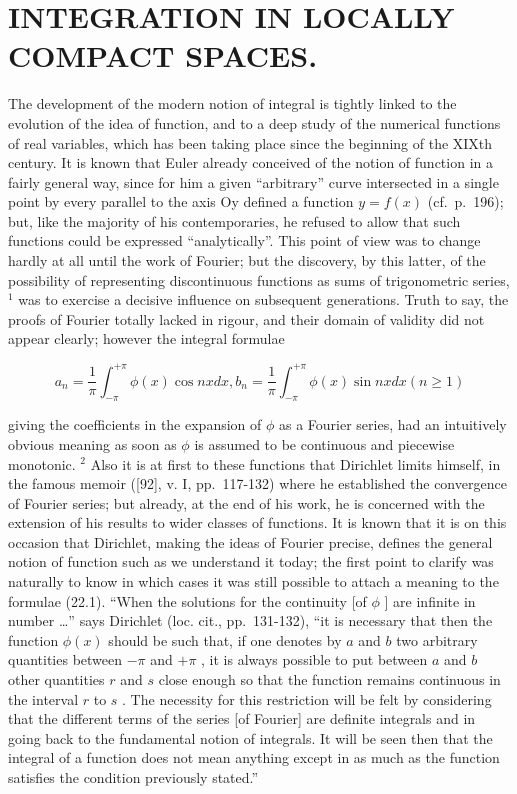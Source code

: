 \chapter{INTEGRATION IN LOCALLY COMPACT SPACES.}

The development of the modern notion of integral is tightly linked to the evolution of the idea of function, and to a deep study of the numerical functions of real variables, which has been taking place since the beginning of the XIXth century. It is known that Euler already conceived of the notion of function in a fairly general way, since for him a given ``arbitrary'' curve intersected in a single point by every parallel to the axis Oy defined a function \(y = f(x)\) (cf.~p.~196); but, like the majority of his contemporaries, he refused to allow that such functions could be expressed ``analytically''. This point of view was to change hardly at all until the work of Fourier; but the discovery, by this latter, of the possibility of representing discontinuous functions as sums of trigonometric series, \(^{1}\) was to exercise a decisive influence on subsequent generations. Truth to say, the proofs of Fourier totally lacked in rigour, and their domain of validity did not appear clearly; however the integral formulae

\[
a _ {n} = \frac {1}{\pi} \int_ {- \pi} ^ {+ \pi} \phi (x) \cos n x d x, b _ {n} = \frac {1}{\pi} \int_ {- \pi} ^ {+ \pi} \phi (x) \sin n x d x (n \geq 1)\tag{22.1}
\]

giving the coefficients in the expansion of \(\phi\) as a Fourier series, had an intuitively obvious meaning as soon as \(\phi\) is assumed to be continuous and piecewise monotonic. \(^{2}\) Also it is at first to these functions that Dirichlet limits himself, in the famous memoir ({[}92{]}, v. I, pp.~117-132) where he established the convergence of Fourier series; but already, at the end of his work, he is concerned with the extension of his results to wider classes of functions. It is known that it is on this occasion that Dirichlet, making the ideas of Fourier precise, defines the general notion of function such as we understand it today; the first point to clarify was naturally to know in which cases it was still possible to attach a meaning to the formulae (22.1). ``When the solutions for the continuity {[}of \(\phi\) {]} are infinite in number \ldots{}'' says Dirichlet (loc. cit., pp.~131-132), ``it is necessary that then the function \(\phi(x)\) should be such that, if one denotes by \(a\) and \(b\) two arbitrary quantities between \(-\pi\) and \(+\pi\) , it is always possible to put between \(a\) and \(b\) other quantities \(r\) and \(s\) close enough so that the function remains continuous in the interval \(r\) to \(s\) . The necessity for this restriction will be felt by considering that the different terms of the series {[}of Fourier{]} are definite integrals and in going back to the fundamental notion of integrals. It will be seen then that the integral of a function does not mean anything except in as much as the function satisfies the condition previously stated.''


